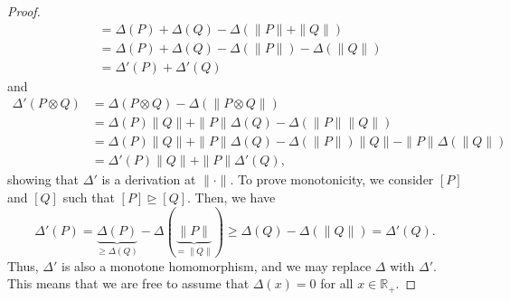 \documentclass[aps,pra,11pt,onecolumn,nofootinbib,tightenlines]{revtex4-2}
\theoremstyle{definition}
\newcommand{\mb}[1]{\mathbb{#1}}
\newcommand{\rgeq}{\trianglerighteq}
\begin{document}
\begin{proof}
\begin{align}
&=\Delta(P)+\Delta(Q)-\Delta(\|P\|+\|Q\|)\\
&=\Delta(P)+\Delta(Q)-\Delta(\|P\|)-\Delta(\|Q\|)\\
&=\Delta'(P)+\Delta'(Q)
\end{align}
and
\begin{align}
\Delta'(P\otimes Q)&=\Delta(P\otimes Q)-\Delta(\|P\otimes Q\|)\\
&=\Delta(P)\|Q\|+\|P\|\Delta(Q)-\Delta(\|P\|\|Q\|)\\
&=\Delta(P)\|Q\|+\|P\|\Delta(Q)-\Delta(\|P\|)\|Q\|-\|P\|\Delta(\|Q\|)\\
&=\Delta'(P)\|Q\|+\|P\|\Delta'(Q),
\end{align}
showing that $\Delta'$ is a derivation at $\|\cdot\|$. To prove monotonicity, we consider $[P]$ and $[Q]$ such that $[P]\rgeq[Q]$. Then, we have
\begin{equation}
\Delta'(P)=\underbrace{\Delta(P)}_{\geq\Delta(Q)}-\Delta(\underbrace{\|P\|}_{=\|Q\|})\geq\Delta(Q)-\Delta(\|Q\|)=\Delta'(Q).
\end{equation}
Thus, $\Delta'$ is also a monotone homomorphism, and we may replace $\Delta$ with $\Delta'$. This means that we are free to assume that $\Delta(x)=0$ for all $x\in\mb R_+$.


\end{proof}
\end{document}
